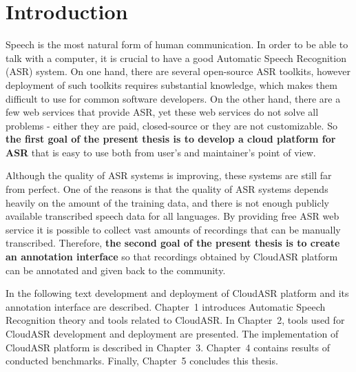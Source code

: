 \chapter*{Introduction}

Speech is the most natural form of human communication.
In order to be able to talk with a computer,
  it is crucial to have a good Automatic Speech Recognition (ASR) system.
On one hand, there are several open-source ASR toolkits,
  however deployment of such toolkits requires substantial knowledge,
  which makes them difficult to use for common software developers.
On the other hand, there are a few web services that provide ASR,
  yet these web services do not solve all problems -
  either they are paid, closed-source or they are not customizable.
So \textbf{the first goal of the present thesis is to develop a cloud platform for ASR}
  that is easy to use both from user's and maintainer's point of view.

Although the quality of ASR systems is improving,
  these systems are still far from perfect.
One of the reasons is that the quality of ASR systems depends heavily on the amount of the training data,
  and there is not enough publicly available transcribed speech data for all languages.
By providing free ASR web service it is possible to collect vast amounts of recordings
  that can be manually transcribed.
Therefore, \textbf{the second goal of the present thesis is to create an annotation interface}
  so that recordings obtained by CloudASR platform can be annotated and given back to the community.

In the following text development and deployment of CloudASR platform and its annotation interface are described.
Chapter~1 introduces Automatic Speech Recognition theory and tools related to CloudASR.
In Chapter~2, tools used for CloudASR development and deployment are presented.
The implementation of CloudASR platform is described in Chapter~3.
Chapter~4 contains results of conducted benchmarks.
Finally, Chapter~5 concludes this thesis.
